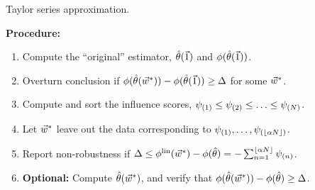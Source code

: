 \begin{frame}{Taylor series approximation.}

\textbf{Procedure:}

\begin{enumerate}
    \item<2-> Compute the ``original'' estimator, $\hat{\theta}(\vec{1})$ and
    $\phi(\hat{\theta}(\vec{1}))$.
    \item<3-> Overturn conclusion if
        $\phi(\hat{\theta}(\vec{w}^*)) - \phi(\hat{\theta}(\vec{1})) \ge \Delta$
        for some $\vec{w}^*$.
    \item<4-> Compute and sort the influence scores,
        $\psi_{(1)} \le \psi_{(2)} \le \ldots \le \psi_{(N)}$.
    \item<5-> Let $\vec{w}^*$ leave out the data corresponding to
    $\psi_{(1)},  \ldots , \psi_{(\lfloor \alpha N \rfloor)}$.
    \item<6-> Report non-robustness if
        $ \Delta \le \phi^{\mathrm{lin}}(\vec{w}^*) - \phi(\hat{\theta})  =
            - \sum_{n=1}^{\lfloor \alpha N \rfloor} \psi_{(n)}$.
    \item<7-> \textbf{Optional: } Compute $\hat{\theta}(\vec{w}^*)$, and verify
    that $\phi(\hat{\theta}(\vec{w}^*)) - \phi(\hat{\theta}) \ge \Delta$.
\end{enumerate}


%
%


\end{frame}


